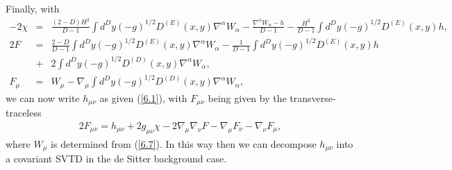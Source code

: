 \documentclass[aps,onecolumn,10pt]{revtex4}
\numberwithin{equation}{section}
\numberwithin{equation}{section}
\begin{document}
%
Finally, with
%
\begin{eqnarray}
-2\chi&=&\frac{(2-D)H^2}{D-1}\int d^Dy(-g)^{1/2}D^{(E)}(x,y)\nabla^{\alpha}W_{\alpha}-\frac{\nabla^{\alpha}W_{\alpha}-h}{D-1}-\frac{H^2}{D-1}\int d^Dy(-g)^{1/2}D^{(E)}(x,y)h,
\nonumber\\
2F&=&\frac{2-D}{D-1}\int d^Dy(-g)^{1/2}D^{(E)}(x,y)\nabla^{\alpha}W_{\alpha}-\frac{1}{D-1}\int d^Dy(-g)^{1/2}D^{(E)}(x,y)h
\nonumber\\
&+&2\int d^Dy(-g)^{1/2}D^{(D)}(x,y)\nabla^{\alpha}W_{\alpha},
\nonumber\\
F_{\mu}&=&W_{\mu}-\nabla_{\mu}\int d^Dy(-g)^{1/2}D^{(D)}(x,y)\nabla^{\alpha}W_{\alpha},
\label{6.10}
\end{eqnarray}
%
we can now write $h_{\mu\nu}$ as given (\ref{6.1}), with $F_{\mu\nu}$ being given by the transverse-traceless
\begin{eqnarray}
2F_{\mu\nu}=h_{\mu\nu}+2g_{\mu\nu}\chi-2\nabla_{\mu}\nabla_{\nu}F
- \nabla_{\mu}F_{\nu}-\nabla_{\nu}F_{\mu},
\label{6.11}
\end{eqnarray}
%
where $W_{\mu}$ is determined from (\ref{6.7}). In this way then we can decompose $h_{\mu\nu}$ into a covariant SVTD in the de Sitter background case.
\end{document}
